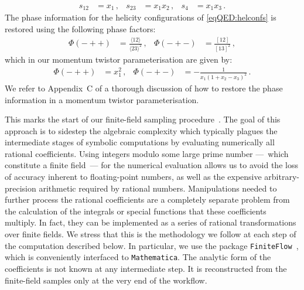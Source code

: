 \documentclass[main.tex]{subfiles}
\begin{document}
\begin{align} \label{eqQED:mtvs}
    s_{12} &= x_1 \,, &
    s_{23} &= x_1 x_2 \,, &
    s_4 &= x_1 x_3 \,.
\end{align}
The phase information for the helicity configurations of \cref{eqQED:helconfs} is restored using the following phase factors: 
\begin{align}
  \Phi(-++) &= \frac{\langle 1 2 \rangle}{\langle 2 3 \rangle^2} \,,&
  \Phi(-+-) &= \frac{[ 1 2 ]}{[ 1 3 ]^2} \,,
\end{align}
which in our momentum twistor parameterisation are given by:
\begin{align}
  \Phi(-++) &= x_1^2 \,,&
  \Phi(-+-) &= - \frac{1}{x_1 (1 + x_2 - x_3)^2}   \,.
\end{align}
We refer to Appendix~C of  a thorough discussion of how to restore the phase information in a momentum twistor parameterisation.

This marks the start of our finite-field sampling
procedure~\cite{Peraro:2016wsq}.  The goal of this approach is to sidestep the
algebraic complexity which typically plagues the intermediate stages of
symbolic computations by evaluating numerically all rational coefficients.
Using integers modulo some large prime number ---~which constitute a finite
field~--- for the numerical evaluation allows us to avoid the loss of accuracy
inherent to floating-point numbers, as well as the expensive
arbitrary-precision arithmetic required by rational numbers.  Manipulations
needed to further process the rational coefficients are a completely separate
problem from the calculation of the integrals or special functions that these
coefficients multiply. In fact, they can be implemented as a series of rational
transformations over finite fields. We stress that this is the methodology we
follow at each step of the computation described below. In particular, we use
the package \texttt{FiniteFlow}~\cite{Peraro:2019svx}, which is conveniently
interfaced to \texttt{Mathematica}. The analytic form of the coefficients is
not known at any intermediate step. It is reconstructed from the finite-field
samples only at the very end of the workflow.
\end{document}
